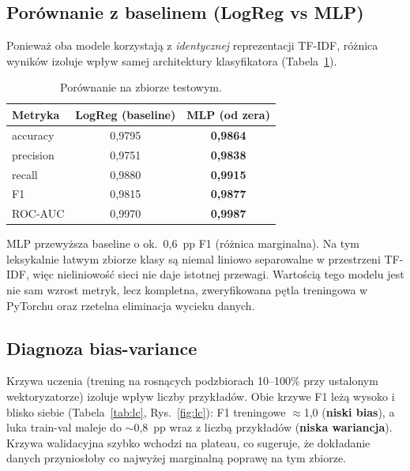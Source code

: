 \subsection{Porównanie z baselinem (LogReg vs MLP)}

Ponieważ oba modele korzystają z \emph{identycznej} reprezentacji TF-IDF, różnica
wyników izoluje wpływ samej architektury klasyfikatora (Tabela~\ref{tab:compare}).

\begin{table}[H]
  \centering
  \caption{Porównanie na zbiorze testowym.}
  \label{tab:compare}
  \begin{tabular}{lcc}
    \toprule
    \textbf{Metryka} & \textbf{LogReg (baseline)} & \textbf{MLP (od zera)} \\
    \midrule
    accuracy  & 0{,}9795 & \textbf{0{,}9864} \\
    precision & 0{,}9751 & \textbf{0{,}9838} \\
    recall    & 0{,}9880 & \textbf{0{,}9915} \\
    F1        & 0{,}9815 & \textbf{0{,}9877} \\
    ROC-AUC   & 0{,}9970 & \textbf{0{,}9987} \\
    \bottomrule
  \end{tabular}
\end{table}

MLP przewyższa baseline o ok.\ 0{,}6~pp F1 (różnica marginalna). Na tym leksykalnie
łatwym zbiorze klasy są niemal liniowo separowalne w przestrzeni TF-IDF, więc
nieliniowość sieci nie daje istotnej przewagi. Wartością tego modelu jest nie sam
wzrost metryk, lecz kompletna, zweryfikowana pętla treningowa w PyTorchu oraz
rzetelna eliminacja wycieku danych.

\subsection{Diagnoza bias-variance}

Krzywa uczenia (trening na rosnących podzbiorach 10--100\% przy ustalonym
wektoryzatorze) izoluje wpływ liczby przykładów. Obie krzywe F1 leżą wysoko i blisko
siebie (Tabela~\ref{tab:lc}, Rys.~\ref{fig:lc}): F1 treningowe $\approx$1{,}0
(\textbf{niski bias}), a luka train-val maleje do $\sim$0{,}8~pp wraz z liczbą
przykładów (\textbf{niska wariancja}). Krzywa walidacyjna szybko wchodzi na plateau,
co sugeruje, że dokładanie danych przyniosłoby co najwyżej marginalną poprawę na tym
zbiorze.

